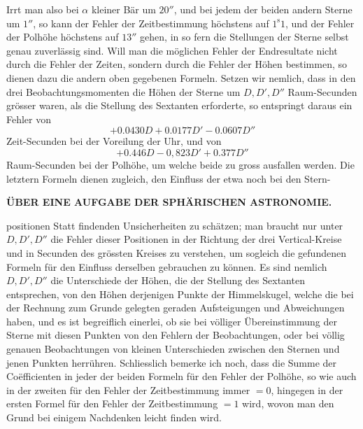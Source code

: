 Irrt man also bei $\alpha$ kleiner Bär um $20''$, und bei jedem der beiden andern Sterne um $1''$, so kann der Fehler der Zeitbestimmung höchstens auf $1^{\mathrm{s}}1$, und der Fehler der Polhöhe höchstens auf $13''$ gehen, in so fern die Stellungen der Sterne selbst genau zuverlässig sind. Will man die möglichen Fehler der Endresultate nicht durch die Fehler der Zeiten, sondern durch die Fehler der Höhen bestimmen, so dienen dazu die andern oben gegebenen Formeln. Setzen wir nemlich, dass in den drei Beobachtungsmomenten die Höhen der Sterne um $D,D',D''$ Raum-Secunden grösser waren, als die Stellung des Sextanten erforderte, so entspringt daraus ein Fehler von
\[
+0.0430D+0.0177D'-0.0607D''
\]
Zeit-Secunden bei der Voreilung der Uhr, und von
\[
+0.446D-0{,}823D'+0.377D''
\]
Raum-Secunden bei der Polhöhe, um welche beide zu gross ausfallen werden. Die letztern Formeln dienen zugleich, den Einfluss der etwa noch bei den Stern-\par
\GaussVIGathering{}{18\textsuperscript{*}}
\par\clearpage
\vspace*{.21\textheight}
\thispagestyle{empty}
\noindent{}%
%
\parbox[t]{\dimexpr\linewidth-24mm\relax}{\centering\fontsize{8.5}{10}\selectfont\bfseries ÜBER EINE AUFGABE DER SPHÄRISCHEN ASTRONOMIE.\par}%
\makebox[12mm][r]{}\par\nobreak\medskip
\noindent positionen Statt findenden Unsicherheiten zu schätzen; man braucht nur unter $D,D',D''$ die Fehler dieser Positionen in der Richtung der drei Vertical-Kreise und in Secunden des grössten Kreises zu verstehen, um sogleich die gefundenen Formeln für den Einfluss derselben gebrauchen zu können. Es sind nemlich $D,D',D''$ die Unterschiede der Höhen, die der Stellung des Sextanten entsprechen, von den Höhen derjenigen Punkte der Himmelskugel, welche die bei der Rechnung zum Grunde gelegten geraden Aufsteigungen und Abweichungen haben, und es ist begreiflich einerlei, ob sie bei völliger Übereinstimmung der Sterne mit diesen Punkten von den Fehlern der Beobachtungen, oder bei völlig genauen Beobachtungen von kleinen Unterschieden zwischen den Sternen und jenen Punkten herrühren. Schliesslich bemerke ich noch, dass die Summe der Coëfficienten in jeder der beiden Formeln für den Fehler der Polhöhe, so wie auch in der zweiten für den Fehler der Zeitbestimmung immer $=0$, hingegen in der ersten Formel für den Fehler der Zeitbestimmung $=1$ wird, wovon man den Grund bei einigem Nachdenken leicht finden wird.
\par\nobreak\vspace{2.6\baselineskip}
\noindent\makebox[\linewidth][c]{\rule{.255\linewidth}{.3pt}}\par
\par\clearpage
\endgroup
